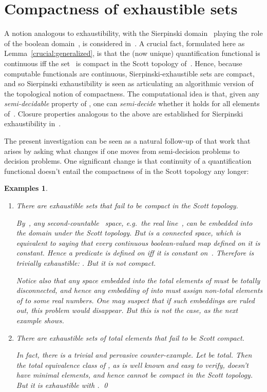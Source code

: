 \documentclass{LMCS}
\newtheorem{Examples}[thm]{Examples}
\newenvironment{examples}{\begin{Examples}}{\end{Examples}}
\begin{document}
\section{Compactness of exhaustible sets} \label{criteria}

A notion analogous to exhaustibility, with the Sierpinski
domain~ playing the role of the boolean
domain~, is considered in~\cite{escardo:barbados}.  A crucial
fact, formulated here as Lemma~\ref{crucial:generalized}, is that the
(now unique) quantification functional  is continuous iff the set~ is compact in the Scott
topology of~.  Hence, because computable functionals are
continuous, Sierpinski-exhaustible sets are compact, and so Sierpinski
exhaustibility is seen as articulating an algorithmic version of the
topological notion of compactness. The computational idea is that,
given any \emph{semi-decidable} property of , one can
\emph{semi-decide} whether it holds for all elements of~. Closure
properties analogous to the above are established for Sierpinski
exhaustibility in~\cite{escardo:barbados}. 

The present investigation can be seen as a natural follow-up of that
work that arises by asking what changes if one moves from
semi-decision problems to decision problems.  One significant change
is that continuity of a quantification functional  doesn't entail the compactness of  in
the Scott topology any longer:

\pagebreak[3]
\begin{examples} \leavevmode
\label{counter:example} 
\begin{enumerate}
\item \label{counter:example:1} \emph{There are exhaustible sets that
    fail to be compact in the Scott topology.}

  \medskip
  \noindent
  By~\cite{scott:datatypes,plotkin:tomega}, any second-countable
  ~space, e.g.\ the real line~, can be embedded into the
  domain  under the Scott topology. But  is a
  connected space, which is equivalent to saying that every continuous
  boolean-valued map defined on it is constant. Hence a predicate  is defined on  iff it is constant on~.
  Therefore  is trivially exhaustible: .
  But it is not compact.

  Notice also that any space embedded into the total elements of
   must be totally disconnected, and hence any
  embedding of  into  must assign non-total
  elements of  to some real numbers. One may suspect
  that if such embeddings are ruled out, this problem would disappear.
  But this is not the case, as the next example shows.

\item \label{counter:example:2} \emph{There are exhaustible sets of
    total elements that fail to be Scott compact.}

  \medskip
  \noindent
  In fact, there is a trivial and pervasive counter-example. Let  be total.  Then the total equivalence
  class  of , as is well known and easy to verify, doesn't have
  minimal elements, and hence cannot be compact in the Scott topology.
  But it is exhaustible with .  \qed
\end{enumerate}
\end{examples}
\end{document}
